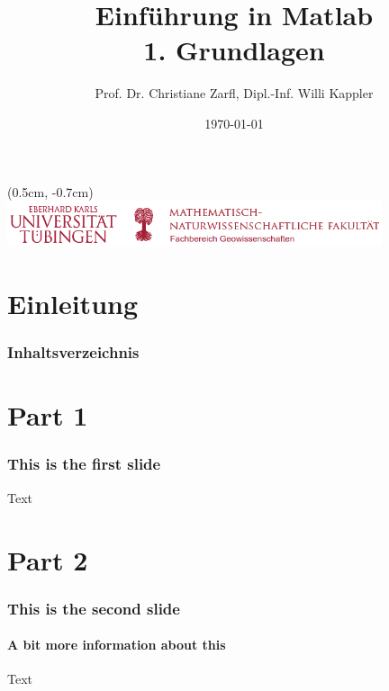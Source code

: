 \documentclass{beamer}
\title{Einführung in Matlab\\{\scriptsize 1. Grundlagen}}
\author{Prof. Dr. Christiane Zarfl, Dipl.-Inf. Willi Kappler}
\date{\today}
\institute{Universität Tübingen}
\begin{document}
    \begin{frame}[plain]
        \begin{textblock*}{0cm}(0.5cm, -0.7cm)
            \includegraphics[width=11.0cm]{logo_uni_tuebingen.png}
        \end{textblock*}
        \titlepage

    \end{frame}

    \section{Einleitung}
    \begin{frame}
        \frametitle{Inhaltsverzeichnis}
        \tableofcontents[currentsection]
    \end{frame}

    \section{Part 1}
    \begin{frame}
        \frametitle{This is the first slide}
        Text
    \end{frame}

    \section{Part 2}
    \begin{frame}
        \frametitle{This is the second slide}
        \framesubtitle{A bit more information about this}
        Text
    \end{frame}
\end{document}
